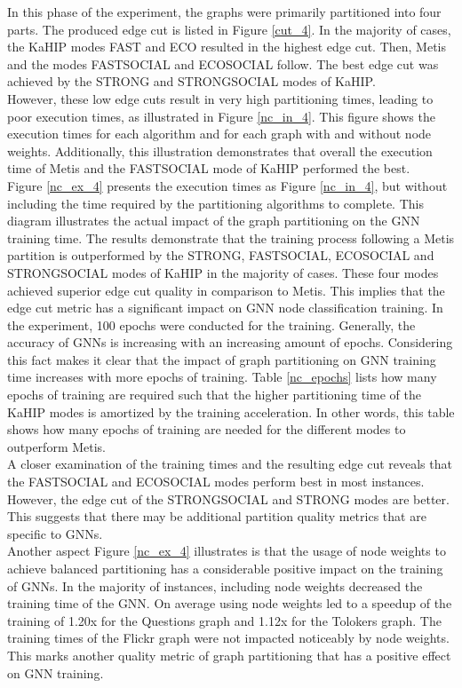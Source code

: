 \documentclass[acmsmall,nonacm,screen,review]{acmart}
\begin{document}
In this phase of the experiment, the graphs were primarily partitioned into four parts. The produced edge cut is listed in Figure \ref{cut_4}. In the majority of cases, the KaHIP modes FAST and ECO resulted in the highest edge cut. Then, Metis and the modes FASTSOCIAL and ECOSOCIAL follow. The best edge cut was achieved by the STRONG and STRONGSOCIAL modes of KaHIP. \\ 
However, these low edge cuts result in very high partitioning times, leading to poor execution times, as illustrated in Figure \ref{nc_in_4}. This figure shows the execution times for each algorithm and for each graph with and without node weights. Additionally, this illustration demonstrates that overall the execution time of Metis and the FASTSOCIAL mode of KaHIP performed the best.  \\
Figure \ref{nc_ex_4} presents the execution times as Figure \ref{nc_in_4}, but without including the time required by the partitioning algorithms to complete. This diagram illustrates the actual impact of the graph partitioning on the GNN training time. The results demonstrate that the training process following a Metis partition is outperformed by the STRONG, FASTSOCIAL, ECOSOCIAL and STRONGSOCIAL modes of KaHIP in the majority of cases. These four modes achieved superior edge cut quality in comparison to Metis. This implies that the edge cut metric has a significant impact on GNN node classification training. In the experiment, 100 epochs were conducted for the training. Generally, the accuracy of GNNs is increasing with an increasing amount of epochs. Considering this fact makes it clear that the impact of graph partitioning on GNN training time increases with more epochs of training. Table \ref{nc_epochs} lists how many epochs of training are required such that the higher partitioning time of the KaHIP modes is amortized by the training acceleration. In other words, this table shows how many epochs of training are needed for the different modes to outperform Metis. \\
A closer examination of the training times and the resulting edge cut reveals that the FASTSOCIAL and ECOSOCIAL modes perform best in most instances. However, the edge cut of the STRONGSOCIAL and STRONG modes are better. This suggests that there may be additional partition quality metrics that are specific to GNNs.\\
Another aspect Figure \ref{nc_ex_4} illustrates is that the usage of node weights to achieve balanced partitioning has a considerable positive impact on the training of GNNs. In the majority of instances, including node weights decreased the training time of the GNN. On average using node weights led to a speedup of the training of 1.20x for the Questions graph and 1.12x for the Tolokers graph. The training times of the Flickr graph were not impacted noticeably by node weights. This marks another quality metric of graph partitioning that has a positive effect on GNN training.\\
\end{document}
